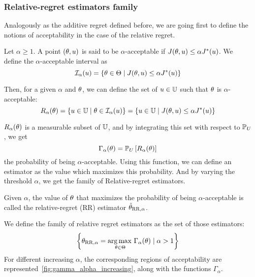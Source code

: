 \documentclass[../../Main_ManuscritThese.tex]{subfiles}
\begin{document}
\subsubsection{Relative-regret estimators family}
Analogously as the additive regret defined before, we are going first to define the notions of acceptability in the case of the relative regret.
\begin{definition}
  Let $\alpha\geq 1$.
  A point $(\theta, u)$ is said to be $\alpha$-acceptable if $J(\theta, u) \leq \alpha J^*(u)$.
  We define the $\alpha$-acceptable interval as
  \begin{equation}
    \mathcal{I}_{\alpha}(u) = \left\{\theta \in \Theta \mid J(\theta,u) \leq \alpha J^*(u) \right\}
  \end{equation}

Then, for a given $\alpha$ and $\theta$, we can define the set of $u\in \mathbb{U}$ such that $\theta$ is $\alpha$-acceptable:
\begin{equation}
  R_{\alpha}(\theta) = \left\{u \in \mathbb{U} \mid \theta \in \mathcal{I}_{\alpha}(u) \right\} = \left\{u \in \mathbb{U} \mid  J(\theta, u) \leq \alpha J^*(u) \right\}
\end{equation}
\end{definition}
$R_{\alpha}(\theta)$ is a measurable subset of $\mathbb{U}$, and by integrating this set with respect to $\mathbb{P}_U$, we get
\begin{equation}
\Gamma_{\alpha}(\theta) = \mathbb{P}_{U}\left[R_\alpha(\theta)\right]
\end{equation}
the probability of being $\alpha$-acceptable. Using this function, we can define an estimator as the value which maximizes this probability. And by varying the threshold $\alpha$, we get the family of Relative-regret estimators.


\begin{definition}
  \label{def:RR_family}
  Given $\alpha$, the value of $\theta$ that maximizes the probability of being $\alpha$-acceptable is called the relative-regret (RR) estimator $\hat{\theta}_{\mathrm{RR},\alpha}$.
  
We define the family of relative regret estimators as the set of those estimators:
\begin{equation}
  \label{eq:def_RR_family}
    \left\{{\theta}_{\mathrm{RR,\alpha}} = \operatorname*{arg\,max \,}_{\theta\in\Theta} \Gamma_{\alpha}(\theta)\mid \alpha > 1\right\}
    \end{equation}
    For different increasing $\alpha$, the corresponding regions of acceptability are represented~\cref{fig:gamma_alpha_increasing}, along with the functions $\Gamma_{\alpha}$.
  \end{definition}
\end{document}

